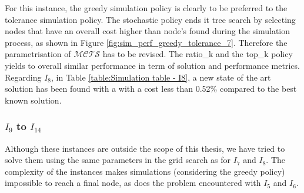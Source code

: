 \documentclass[conference]{IEEEtran}
\begin{document}
For this instance, the greedy simulation policy is clearly to be preferred to the tolerance simulation policy. The stochastic policy ends it tree search by selecting nodes that have an overall cost higher than node's found during the simulation process, as shown in Figure \ref{fig:sim_perf_greedy_tolerance_7}. Therefore the parametrisation of $\mathcal{MCTS}$ has to be revised. The ratio\_k and the top\_k policy yields to overall similar performance in term of solution and performance metrics.
Regarding $I_8$, in Table \ref{table:Simulation table - I8}, a new state of the art solution has been found with a with a cost less than 0.52\% compared to the best known solution.
\begin{table}[!ht]
    \centering
    \caption{Simulation table - $I_8$}
    \label{table:Simulation table - I8}
\end{table}




\subsubsection{$I_9$ to $I_{14}$}

Although these instances are outside the scope of this thesis, we have tried to solve them using the same parameters in the grid search as for $I_7$ and $I_8$. The complexity of the instances makes simulations (considering the greedy policy) impossible to reach a final node, as does the problem encountered with $I_5$ and $I_6$.
\end{document}
